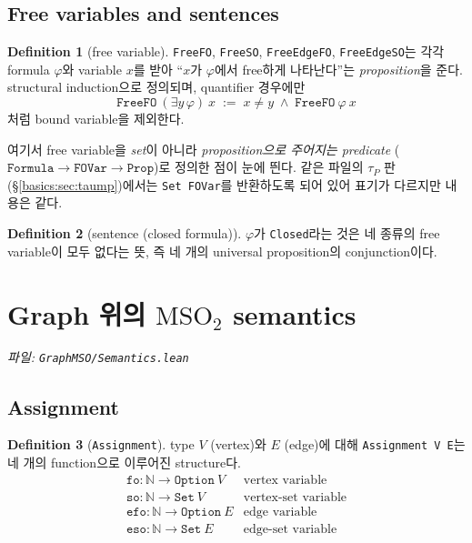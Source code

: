 \documentclass[11pt]{article}
\theoremstyle{definition}
\newtheorem{definition}{Definition}[section]
\theoremstyle{plain}
\newcommand{\MSOtwo}{\mathrm{MSO}_2}
\newcommand{\lean}[1]{\texttt{#1}}
\newcommand{\leanfile}[1]{\texttt{#1}}
\begin{document}
\subsection{Free variables and sentences}

\begin{definition}[free variable]
\label{basics:def:free}
\lean{FreeFO}, \lean{FreeSO}, \lean{FreeEdgeFO}, \lean{FreeEdgeSO}는 각각
formula $\varphi$와 variable $x$를 받아 ``$x$가 $\varphi$에서 free하게
나타난다''는 \emph{proposition}을 준다. structural induction으로 정의되며,
quantifier 경우에만
\[
  \lean{FreeFO}\ (\exists y\, \varphi)\ x \;:=\; x \neq y \;\land\; \lean{FreeFO}\ \varphi\ x
\]
처럼 bound variable을 제외한다.
\end{definition}

여기서 free variable을 \emph{set}이 아니라 \emph{proposition으로 주어지는
predicate} ($\lean{Formula} \to \lean{FOVar} \to \lean{Prop}$)로 정의한 점이
눈에 띈다. 같은 파일의 $\tau_P$ 판 (\S\ref{basics:sec:taump})에서는
\lean{Set FOVar}를 반환하도록 되어 있어 표기가 다르지만 내용은 같다.

\begin{definition}[sentence (closed formula)]
\label{basics:def:closed}
$\varphi$가 \lean{Closed}라는 것은 네 종류의 free variable이 모두 없다는 뜻,
즉 네 개의 universal proposition의 conjunction이다.
\end{definition}

\section{Graph 위의 \texorpdfstring{$\MSOtwo$}{MSO2} semantics}
\label{basics:sec:semantics}

\emph{파일: \leanfile{GraphMSO/Semantics.lean}}

\subsection{Assignment}

\begin{definition}[\lean{Assignment}]
\label{basics:def:assignment}
type $V$ (vertex)와 $E$ (edge)에 대해 \lean{Assignment V E}는 네 개의
function으로 이루어진 structure다.
\[
\begin{array}{ll}
  \lean{fo} : \mathbb{N} \to \lean{Option}\ V & \text{vertex variable} \\
  \lean{so} : \mathbb{N} \to \lean{Set}\ V & \text{vertex-set variable} \\
  \lean{efo} : \mathbb{N} \to \lean{Option}\ E & \text{edge variable} \\
  \lean{eso} : \mathbb{N} \to \lean{Set}\ E & \text{edge-set variable}
\end{array}
\]
\end{definition}
\end{document}
